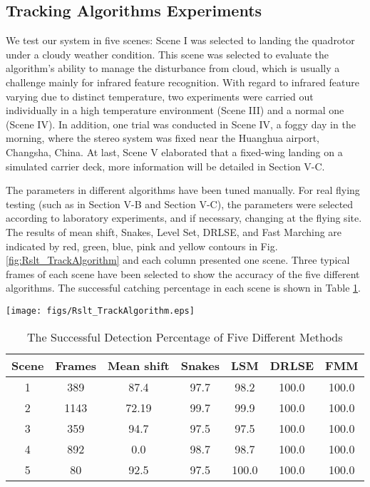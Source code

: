 \documentclass[letterpaper, 10 pt, conference]{ieeeconf}  %
\begin{document}
\subsection{Tracking Algorithms Experiments}
We test our system in five scenes: Scene I was selected to landing the quadrotor under a cloudy weather condition. This scene was selected to evaluate the algorithm's ability to manage the disturbance from cloud, which is usually a challenge mainly for infrared feature recognition. With regard to infrared feature varying due to distinct temperature, two experiments were carried out individually in a high temperature environment (Scene III) and a normal one (Scene IV). In addition, one trial was conducted in Scene IV, a foggy day in the morning, where the stereo system was fixed near the Huanghua airport, Changsha, China. At last, Scene V elaborated that a fixed-wing landing on a simulated carrier deck, more information will be detailed in Section V-C. 

The parameters in different algorithms have been tuned manually. For real flying testing (such as in Section V-B and Section V-C), the parameters were selected according to laboratory experiments, and if necessary, changing at the flying site. The results of mean shift, Snakes, Level Set, DRLSE, and Fast Marching are indicated by red, green, blue, pink and yellow contours in Fig. \ref{fig:Rslt_TrackAlgorithm} and each column presented one scene. Three typical frames of each scene have been selected to show the accuracy of the five different algorithms. The successful catching percentage in each scene is shown in Table \ref{tab:Five_Methods}.
   \begin{figure*}[!tb]
      \centering
      \texttt{[image: figs/Rslt\_TrackAlgorithm.eps]}
      \caption{The typical results of mean shift, Snakes, Level Set Method, DRLSE, Fast Marching Method are indicated by red, green, blue, pink and yellow contours.}
      \label{fig:Rslt_TrackAlgorithm}
   \end{figure*}
      \begin{table}[!tb]
    \caption{The Successful Detection Percentage of Five Different Methods}
    \begin{center}
    \renewcommand{\arraystretch}{1.2}
    \begin{tabular}{|c|c|c|c|c|c|c|}
    \hline
    Scene  & Frames & Mean shift & Snakes & LSM  & DRLSE   & FMM     \\ \hline \hline
    1      &  389   & 87.4      & 97.7   & 98.2 & 100.0   & 100.0   \\ \hline
    2      &  1143  & 72.19     & 99.7   & 99.9 & 100.0   & 100.0   \\ \hline
    3      &  359   & 94.7      & 97.5   & 97.5 & 100.0   & 100.0   \\ \hline
    4      &  892   & 0.0       & 98.7   & 98.7 & 100.0   & 100.0   \\ \hline
    5      &  80    & 92.5      & 97.5   & 100.0& 100.0   & 100.0   \\ \hline
    \end{tabular}
    \end{center}

    \label{tab:Five_Methods}
    \end{table}
    
\end{document}
